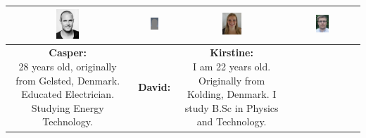 \begin{table}[h]
\centering
\begin{tabular}{|c|c|c|c|}
\hline
\includegraphics[width=0.2\textwidth]{graphics/cgopic} & %
\includegraphics[width=0.2\textwidth]{graphics/AnonProfile} & %
\includegraphics[width=0.2\textwidth]{graphics/Kirstine} & %
\includegraphics[width=0.2\textwidth]{graphics/Nikolaj_profile} \\ \hline %
\parbox[t] {0.2\textwidth}{
\textbf{Casper:} \\
28 years old, originally from Gelsted, Denmark. Educated Electrician. Studying Energy Technology.
}

&

\parbox[t] {0.2\textwidth}{
\textbf{David:} \\

} 

&

\parbox[t] {0.2\textwidth}{
\textbf{Kirstine:} \\
I am 22 years old. Originally from Kolding, Denmark. I study B.Sc in Physics and Technology.
} 


\end{tabular}
\end{table}
